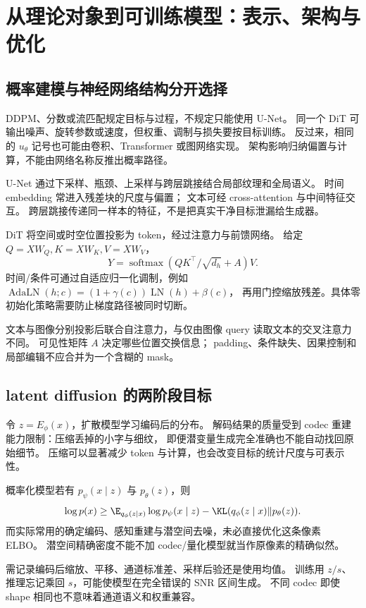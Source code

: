 \chapter{从理论对象到可训练模型：表示、架构与优化}
\label{th:representation}

\section{概率建模与神经网络结构分开选择}

DDPM、分数或流匹配规定目标与过程，不规定只能使用 U-Net。
同一个 DiT 可输出噪声、旋转参数或速度，但权重、调制与损失要按目标训练。
反过来，相同的 $u_\theta$ 记号也可能由卷积、Transformer 或图网络实现。
架构影响归纳偏置与计算，不能由网络名称反推出概率路径。

U-Net 通过下采样、瓶颈、上采样与跨层跳接结合局部纹理和全局语义。
时间 embedding 常进入残差块的尺度与偏置；
文本可经 cross-attention 与中间特征交互。
跨层跳接传递同一样本的特征，不是把真实干净目标泄漏给生成器。

DiT 将空间或时空位置投影为 token，经过注意力与前馈网络。
给定 $Q=XW_Q,K=XW_K,V=XW_V$，
\[
Y=\operatorname{softmax}(QK^\top/\sqrt{d_h}+A)V.
\]
时间/条件可通过自适应归一化调制，例如
$\operatorname{AdaLN}(h;c)=(1+\gamma(c))\operatorname{LN}(h)+\beta(c)$，
再用门控缩放残差。具体零初始化策略需要防止梯度路径被同时切断。

文本与图像分别投影后联合自注意力，与仅由图像 query 读取文本的交叉注意力不同。
可见性矩阵 $A$ 决定哪些位置交换信息；
padding、条件缺失、因果控制和局部编辑不应合并为一个含糊的 mask。

\section{latent diffusion 的两阶段目标}

令 $z=E_\phi(x)$，扩散模型学习编码后的分布。
解码结果的质量受到 codec 重建能力限制：压缩丢掉的小字与细纹，
即便潜变量生成完全准确也不能自动找回原始细节。
压缩可以显著减少 token 与计算，也会改变目标的统计尺度与可表示性。

概率化模型若有 $p_\psi(x\mid z)$ 与 $p_\theta(z)$，则
\[
\log p(x)\geq\E_{q_\phi(z\mid x)}\log p_\psi(x\mid z)
 -\KL(q_\phi(z\mid x)\Vert p_\theta(z)).
\]
而实际常用的确定编码、感知重建与潜空间去噪，未必直接优化这条像素 ELBO。
潜空间精确密度不能不加 codec/量化模型就当作原像素的精确似然。

需记录编码后缩放、平移、通道标准差、采样后验还是使用均值。
训练用 $z/s$、推理忘记乘回 $s$，可能使模型在完全错误的 SNR 区间生成。
不同 codec 即使 shape 相同也不意味着通道语义和权重兼容。

